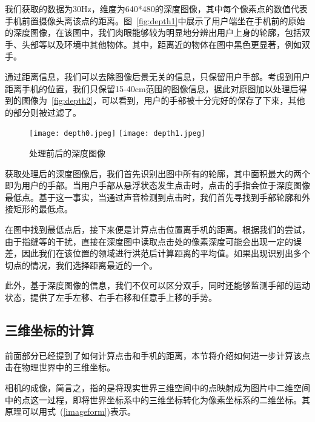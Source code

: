 我们获取的数据为30Hz，维度为640*480的深度图像，其中每个像素点的数值代表手机前置摄像头离该点的距离。图~\ref{fig:depth1}中展示了用户端坐在手机前的原始的深度图像，在该图中，我们肉眼能够较为明显地分辨出用户上身的轮廓，包括双手、头部等以及环境中其他物体。其中，距离近的物体在图中黑色更显著，例如双手。

通过距离信息，我们可以去除图像后景无关的信息，只保留用户手部。考虑到用户距离手机的位置，我们只保留15-40cm范围的图像信息，据此对原图加以处理后得到的图像为~\ref{fig:depth2}，可以看到，用户的手部被十分完好的保存了下来，其他的部分则被过滤了。
\begin{figure}[h]
  \centering%
    {\texttt{[image: depth0.jpeg]}}%
  \hspace{4em}%
      {\texttt{[image: depth1.jpeg]}}
  \caption{处理前后的深度图像}
  \label{fig:depth-image}
\end{figure}

获取处理后的深度图像后，我们首先识别出图中所有的轮廓，其中面积最大的两个即为用户的手部。当用户手部从悬浮状态发生点击时，点击的手指会位于深度图像最低点。基于这一事实，当通过声音检测到点击时，我们首先寻找到手部轮廓和外接矩形的最低点。

在图中找到最低点后，接下来便是计算点击位置离手机的距离。根据我们的尝试，由于指缝等的干扰，直接在深度图中读取点击处的像素深度可能会出现一定的误差，因此我们在该位置的领域进行洪范后计算距离的平均值。如果出现识别出多个切点的情况，我们选择距离最近的一个。

此外，基于深度图像的信息，我们不仅可以区分双手，同时还能够监测手部的运动状态，提供了左手左移、右手右移和任意手上移的手势。

\subsection{三维坐标的计算}
前面部分已经提到了如何计算点击和手机的距离，本节将介绍如何进一步计算该点击在物理世界中的三维坐标。

相机的成像，简言之，指的是将现实世界三维空间中的点映射成为图片中二维空间中的点这一过程，即将世界坐标系中的三维坐标转化为像素坐标系的二维坐标。其原理可以用式~(\ref{imageform})表示。


